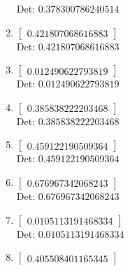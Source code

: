 \documentclass[12pt]{article}
\begin{document}
\begin{enumerate}
Det: $0.378300786240514$\\

\item $\displaystyle \left[\begin{matrix}0.421807068616883\end{matrix}\right]$\\

Det: $0.421807068616883$\\

\item $\displaystyle \left[\begin{matrix}0.012490622793819\end{matrix}\right]$\\

Det: $0.012490622793819$\\

\item $\displaystyle \left[\begin{matrix}0.385838222203468\end{matrix}\right]$\\

Det: $0.385838222203468$\\

\item $\displaystyle \left[\begin{matrix}0.459122190509364\end{matrix}\right]$\\

Det: $0.459122190509364$\\

\item $\displaystyle \left[\begin{matrix}0.676967342068243\end{matrix}\right]$\\

Det: $0.676967342068243$\\

\item $\displaystyle \left[\begin{matrix}0.0105113191468334\end{matrix}\right]$\\

Det: $0.0105113191468334$\\

\item $\displaystyle \left[\begin{matrix}0.405508401165345\end{matrix}\right]$\\


\end{enumerate}
\end{document}
